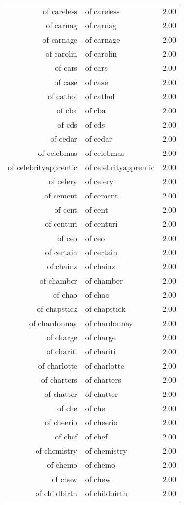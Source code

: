 \begin{table}[ht]
\begin{tabular}{rlr}
  of careless & of careless & 2.00 \\ 
  of carnag & of carnag & 2.00 \\ 
  of carnage & of carnage & 2.00 \\ 
  of carolin & of carolin & 2.00 \\ 
  of cars & of cars & 2.00 \\ 
  of case & of case & 2.00 \\ 
  of cathol & of cathol & 2.00 \\ 
  of cba & of cba & 2.00 \\ 
  of cds & of cds & 2.00 \\ 
  of cedar & of cedar & 2.00 \\ 
  of celebmas & of celebmas & 2.00 \\ 
  of celebrityapprentic & of celebrityapprentic & 2.00 \\ 
  of celery & of celery & 2.00 \\ 
  of cement & of cement & 2.00 \\ 
  of cent & of cent & 2.00 \\ 
  of centuri & of centuri & 2.00 \\ 
  of ceo & of ceo & 2.00 \\ 
  of certain & of certain & 2.00 \\ 
  of chainz & of chainz & 2.00 \\ 
  of chamber & of chamber & 2.00 \\ 
  of chao & of chao & 2.00 \\ 
  of chapstick & of chapstick & 2.00 \\ 
  of chardonnay & of chardonnay & 2.00 \\ 
  of charge & of charge & 2.00 \\ 
  of chariti & of chariti & 2.00 \\ 
  of charlotte & of charlotte & 2.00 \\ 
  of charters & of charters & 2.00 \\ 
  of chatter & of chatter & 2.00 \\ 
  of che & of che & 2.00 \\ 
  of cheerio & of cheerio & 2.00 \\ 
  of chef & of chef & 2.00 \\ 
  of chemistry & of chemistry & 2.00 \\ 
  of chemo & of chemo & 2.00 \\ 
  of chew & of chew & 2.00 \\ 
  of childbirth & of childbirth & 2.00 \\ 

\end{tabular}
\end{table}
